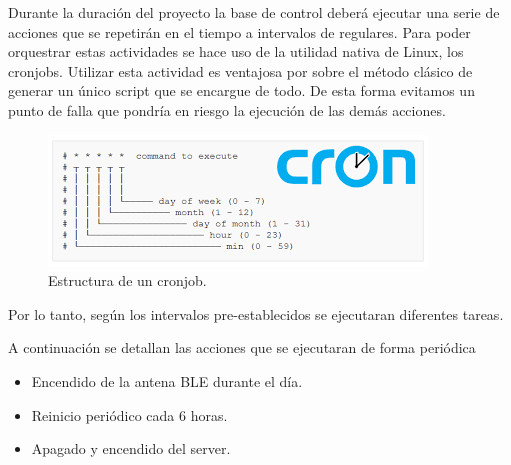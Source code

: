 Durante la duración del proyecto la base de control deberá ejecutar una serie de acciones que se repetirán en el tiempo a intervalos de regulares. Para poder orquestrar estas actividades se hace uso de la utilidad nativa de Linux, los cronjobs. 
Utilizar esta actividad es ventajosa por sobre el método clásico de generar un único script que se encargue de todo. De esta forma evitamos un punto de falla que pondría en riesgo la ejecución de las demás acciones. 

\begin{figure}[H]
	\centering
	\includegraphics[width=0.7\linewidth]{"../Ingenieria de Detalle/ImagenesIngenieria de Detalle/cron"}
	\caption{Estructura de un cronjob.}
	\label{fig:cron}
\end{figure}

Por lo tanto, según los intervalos pre-establecidos se ejecutaran diferentes tareas.

A continuación se detallan las acciones que se ejecutaran de forma periódica  
\begin{itemize}
	\item Encendido de la antena BLE durante el día.
	\item Reinicio periódico cada 6 horas.
	\item Apagado y encendido del server. 
\end{itemize}











